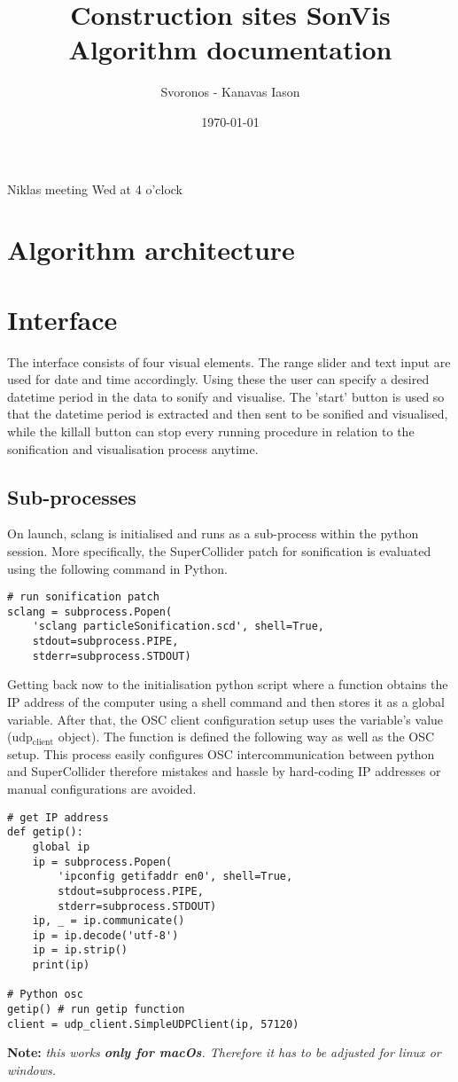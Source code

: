 \documentclass[11pt]{article}
\author{Svoronos - Kanavas Iason}
\date{\today}
\title{Construction sites SonVis Algorithm documentation}
\begin{document}
\maketitle
\tableofcontents

Niklas meeting
Wed at 4 o'clock

\section{Algorithm architecture}
\label{sec:orgaa3e303}

\section{Interface}
\label{sec:org0bb0f45}
The interface consists of four visual elements.  The range slider and text input are used for date and time accordingly. Using these the user can specify a desired datetime period in the data to sonify and visualise.  The 'start' button is used so that the datetime period is extracted and then sent to be sonified and visualised, while the killall button can stop every running procedure in relation to the sonification and visualisation process anytime.

\subsection{Sub-processes}
\label{sec:orgc54f63c}
On launch, sclang is initialised and runs as a sub-process within the python session.  More specifically, the SuperCollider  patch for sonification is evaluated using the following command in Python.
\begin{verbatim}
# run sonification patch
sclang = subprocess.Popen(
    'sclang particleSonification.scd', shell=True,
    stdout=subprocess.PIPE,
    stderr=subprocess.STDOUT)
\end{verbatim}
Getting back now to the initialisation python script where a function obtains the IP address of the computer using a shell command and then stores it as a global variable.  After that, the OSC client configuration setup uses the variable's value (udp\(_{\text{client}}\) object).  The function is defined the following way as well as the OSC setup.  This process easily configures OSC intercommunication between python and SuperCollider therefore mistakes and hassle by hard-coding IP addresses or manual configurations are avoided.

\begin{verbatim}
# get IP address
def getip():
    global ip
    ip = subprocess.Popen(
        'ipconfig getifaddr en0', shell=True,
        stdout=subprocess.PIPE,
        stderr=subprocess.STDOUT)
    ip, _ = ip.communicate()
    ip = ip.decode('utf-8')
    ip = ip.strip()
    print(ip)

# Python osc
getip() # run getip function
client = udp_client.SimpleUDPClient(ip, 57120)
\end{verbatim}
\textbf{Note:} \emph{this works \textbf{only for macOs}.  Therefore it has to be adjusted for linux or windows.}
\end{document}
